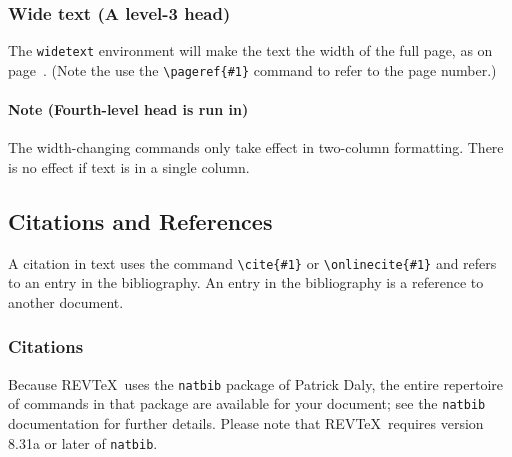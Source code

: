 \documentclass[%
    reprint,
    amsmath,amssymb,
    aps,
   ]{revtex4-1}
\begin{document}
   \subsubsection{Wide text (A level-3 head)}
   The \texttt{widetext} environment will make the text the width of the
   full page, as on page~\pageref{eq:wideeq}. (Note the use the
   \verb+\pageref{#1}+ command to refer to the page number.) 
   \paragraph{Note (Fourth-level head is run in)}
   The width-changing commands only take effect in two-column formatting. 
   There is no effect if text is in a single column.
   
   \subsection{\label{sec:citeref}Citations and References}
   A citation in text uses the command \verb+\cite{#1}+ or
   \verb+\onlinecite{#1}+ and refers to an entry in the bibliography. 
   An entry in the bibliography is a reference to another document.
   
   \subsubsection{Citations}
   Because REV\TeX\ uses the \verb+natbib+ package of Patrick Daly, 
   the entire repertoire of commands in that package are available for your document;
   see the \verb+natbib+ documentation for further details. Please note that
   REV\TeX\ requires version 8.31a or later of \verb+natbib+.
   
\end{document}

